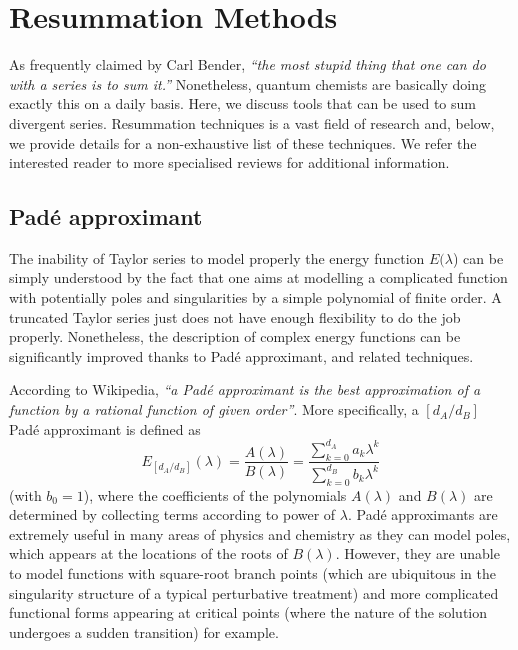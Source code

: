\documentclass[aps,prb,reprint,noshowkeys,superscriptaddress]{revtex4-1}
\begin{document}
\section{Resummation Methods}
\label{sec:Resummation}

As frequently claimed by Carl Bender, \textit{``the most stupid thing that one can do with a series is to sum it.''}
Nonetheless, quantum chemists are basically doing exactly this on a daily basis.
Here, we discuss tools that can be used to sum divergent series.
Resummation techniques is a vast field of research and, below, we provide details for a non-exhaustive list of these techniques.
We refer the interested reader to more specialised reviews for additional information. \cite{Goodson_2011,Goodson_2019}

\subsection{Pad\'e approximant}
The inability of Taylor series to model properly the energy function $E(\lambda$) can be simply understood by the fact that one aims at modelling a complicated function with potentially poles and singularities by a simple polynomial of finite order.
A truncated Taylor series just does not have enough flexibility to do the job properly.
Nonetheless, the description of complex energy functions can be significantly improved thanks to Pad\'e approximant, \cite{Pade_1892} and related techniques. \cite{BakerBook,BenderBook}

According to Wikipedia, \textit{``a Pad\'e approximant is the best approximation of a function by a rational function of given order''}. 
More specifically, a $[d_A/d_B]$ Pad\'e approximant is defined as 
\begin{equation}
	\label{eq:PadeApp}
	E_{[d_A/d_B]}(\lambda) = \frac{A(\lambda)}{B(\lambda)} = \frac{\sum_{k=0}^{d_A} a_k \lambda^k}{\sum_{k=0}^{d_B} b_k \lambda^k}
\end{equation}
(with $b_0 = 1$), where the coefficients of the polynomials $A(\lambda)$ and $B(\lambda)$ are determined by collecting terms according to power of $\lambda$.
Pad\'e approximants are extremely useful in many areas of physics and chemistry \cite{Loos_2013,Pavlyukh_2017,Tarantino_2019,Gluzman_2020} as they can model poles, which appears at the locations of the roots of $B(\lambda)$. 
However, they are unable to model functions with square-root branch points (which are ubiquitous in the singularity structure of a typical perturbative treatment) and more complicated functional forms appearing at critical points (where the nature of the solution undergoes a sudden transition) for example.
\end{document}
